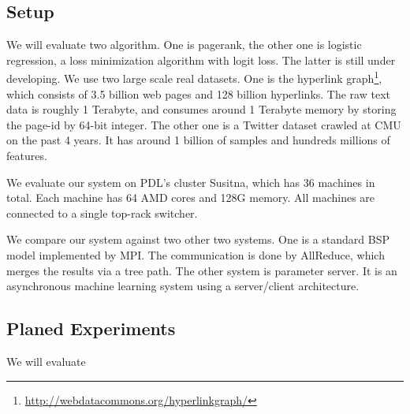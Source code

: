 \documentclass{acm_proc_article-sp}
\begin{document}
\subsection{Setup}

We will evaluate two algorithm. One is pagerank, the other one is logistic
regression, a loss minimization algorithm with logit loss. The latter is still
under developing. We use two large scale real datasets. One is the hyperlink
graph\footnote{\url{http://webdatacommons.org/hyperlinkgraph/}}, which consists
of 3.5 billion web pages and 128 billion hyperlinks. The raw text data is
roughly 1 Terabyte, and consumes around 1 Terabyte memory by storing the page-id
by 64-bit integer. The other one is a Twitter dataset crawled at CMU on the past
4 years. It has around 1 billion of samples and hundreds millions of
features.

We evaluate our system on PDL's cluster Susitna, which has 36 machines in
total. Each machine has 64 AMD cores and 128G memory. All machines are connected
to a single top-rack switcher.

We compare our system against two other two systems. One is a standard BSP
model implemented by MPI. The communication is done by AllReduce, which merges
the results via a tree path. The other system is parameter server. It is an
asynchronous machine learning system using a server/client architecture.

\subsection{Planed Experiments}

We will evaluate




\end{document}
